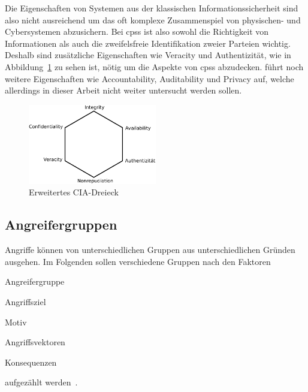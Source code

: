 \documentclass[final,bibliography=totocnumbered]{include/sikseminar}
\newcommand{\cps}{\glspl{cps}\xspace}
\begin{document}
Die Eigenschaften von Systemen aus der klassischen Informationssicherheit sind also nicht ausreichend um das oft komplexe Zusammenspiel von physischen- und Cybersystemen abzusichern.
Bei \cps ist also sowohl die Richtigkeit von Informationen als auch die zweifelsfreie Identifikation zweier Parteien wichtig.
Deshalb sind zusätzliche Eigenschaften wie Veracity und Authentizität, wie in Abbildung~\ref{fig:triad} zu sehen ist, nötig um die Aspekte von \cps abzudecken.
\citeauthor{CH13} führt noch weitere Eigenschaften wie Accountability, Auditability und Privacy auf, welche allerdings in dieser Arbeit nicht weiter untersucht werden sollen.

\begin{figure}
    \centering
    \includegraphics[width=0.5\textwidth]{triad}
    \caption{Erweitertes CIA-Dreieck}
    \label{fig:triad}
\end{figure}



\subsection{Angreifergruppen}\label{subsec:angreifergruppen}

Angriffe können von unterschiedlichen Gruppen aus unterschiedlichen Gründen ausgehen.
Im Folgenden sollen verschiedene Gruppen nach den Faktoren
\begin{enumerate*}[label=(\alph*),before=\unskip{: }, itemjoin={{; }}, itemjoin*={{, und }}]
    \item Angreifergruppe\label{factor:angreifergruppe}
    \item Angriffsziel\label{factor:target}
    \item Motiv\label{factor:motiv}
    \item Angriffsvektoren\label{factor:methode}
    \item Konsequenzen\label{factor:konsequenz}
\end{enumerate*} aufgezählt werden~\cite{HLL+17}.
\end{document}
